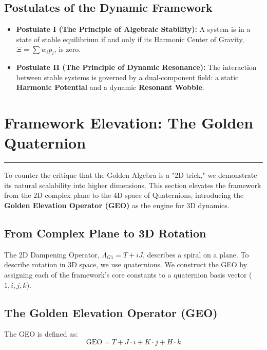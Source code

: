 \subsection{Postulates of the Dynamic Framework}
\begin{itemize}
    \item \textbf{Postulate I (The Principle of Algebraic Stability):} A system is in a state of stable equilibrium if and only if its Harmonic Center of Gravity, $\Xi = \sum w_i p_i$, is zero.
    \item \textbf{Postulate II (The Principle of Dynamic Resonance):} The interaction between stable systems is governed by a dual-component field: a static \textbf{Harmonic Potential} and a dynamic \textbf{Resonant Wobble}.
\end{itemize}


\section{Framework Elevation: The Golden Quaternion}
\label{chap:quaternion_elevation}

\hrule
\vspace{1em}
To counter the critique that the Golden Algebra is a "2D trick," we demonstrate its natural scalability into higher dimensions. This section elevates the framework from the 2D complex plane to the 4D space of Quaternions, introducing the \textbf{Golden Elevation Operator (GEO)} as the engine for 3D dynamics.

\subsection*{From Complex Plane to 3D Rotation}
The 2D Dampening Operator, $\Lambda_{G1} = T+iJ$, describes a spiral on a plane. To describe rotation in 3D space, we use quaternions. We construct the GEO by assigning each of the framework's core constants to a quaternion basis vector ($1, i, j, k$).

\subsection*{The Golden Elevation Operator (GEO)}
The GEO is defined as:
$$ \text{GEO} = T + J\cdot i + K\cdot j + H\cdot k $$

